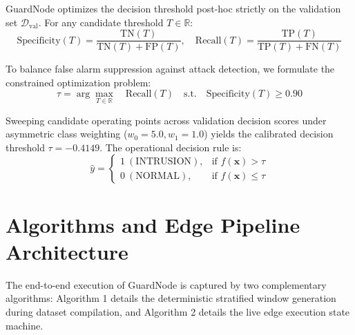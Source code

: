 \documentclass[conference]{IEEEtran}
\begin{document}
GuardNode optimizes the decision threshold post-hoc strictly on the validation set $\mathcal{D}_{\text{val}}$. For any candidate threshold $T \in \mathbb{R}$:
\begin{equation}
\text{Specificity}(T) = \frac{\text{TN}(T)}{\text{TN}(T) + \text{FP}(T)}, \quad \text{Recall}(T) = \frac{\text{TP}(T)}{\text{TP}(T) + \text{FN}(T)}
\end{equation}

To balance false alarm suppression against attack detection, we formulate the constrained optimization problem:
\begin{equation}
\tau = \arg\max_{T \in \mathbb{R}} \quad \text{Recall}(T) \quad \text{s.t.} \quad \text{Specificity}(T) \ge 0.90
\end{equation}

Sweeping candidate operating points across validation decision scores under asymmetric class weighting ($w_0 = 5.0, w_1 = 1.0$) yields the calibrated decision threshold $\tau = -0.4149$. The operational decision rule is:
\begin{equation}
\hat{y} = \begin{cases} 1 \ (\text{INTRUSION}), & \text{if } f(\mathbf{x}) > \tau \\ 0 \ (\text{NORMAL}), & \text{if } f(\mathbf{x}) \le \tau \end{cases}
\end{equation}

\section{Algorithms and Edge Pipeline Architecture}

The end-to-end execution of GuardNode is captured by two complementary algorithms: Algorithm 1 details the deterministic stratified window generation during dataset compilation, and Algorithm 2 details the live edge execution state machine.
\end{document}

